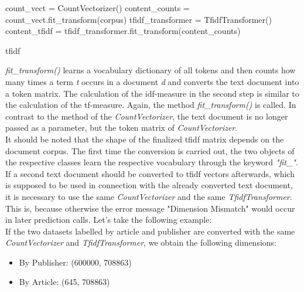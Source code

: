 \documentclass[a4paper, 11pt,titlepage,oneside,openany]{book}
\begin{document}
\begin{algorithm}[t]
	\DontPrintSemicolon
	count\_vect = CountVectorizer()\;
	content\_counts = count\_vect.fit\_transform(corpus)\;
	\BlankLine
	tfidf\_transformer = TfidfTransformer()\;
	content\_tfidf = tfidf\_transformer.fit\_transform(content\_counts)\;
	\caption{\gls{tfidf}}
\end{algorithm}
\noindent \textit{fit\_transform()} learns a vocabulary dictionary of all tokens and then counts how many times a term \textit{t} occurs in a document \textit{d} and converts the text document into a token matrix.
\noindent The calculation of the \gls{idf}-measure in the second step is similar to the calculation of the \gls{tf}-measure. Again, the method \textit{fit\_transform()} is called. In contrast to the method of the \textit{CountVectorizer}, the text document is no longer passed as a parameter, but the token matrix of \textit{CountVectorizer}. \\
\noindent It should be noted that the shape of the finalized \gls{tfidf} matrix depends on the document corpus. The first time the conversion is carried out, the two objects of the respective classes learn the respective vocabulary through the keyword \textit{"fit\_"}. If a second text document should be converted to \gls{tfidf} vectors afterwards, which is supposed to be used in connection with the already converted text document, it is necessary to use the same \textit{CountVectorizer} and the same \textit{TfidfTransformer}. This is, because otherwise the error message "Dimension Mismatch" would occur in later prediction calls.
Let's take the following example: \\
\noindent If the two datasets labelled by article and publisher are converted with the same \textit{CountVectorizer} and \textit{TfidfTransformer}, we obtain the following dimensions:
\begin{itemize}
	\item By Publisher: (600000, 708863)
	\item By Article: (645, 708863)	
\end{itemize}
\end{document}
